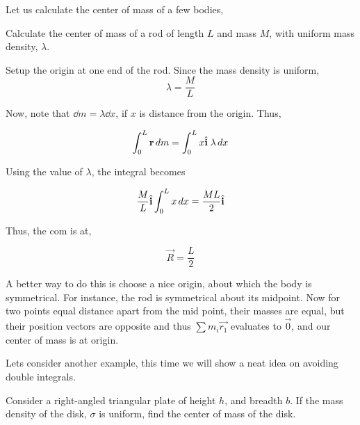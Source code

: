 Let us calculate the center of mass of a few bodies, 

\begin{example}
    Calculate the center of mass of a rod of length \(L\) and mass \(M\), with uniform mass density, \(\lambda\).
\end{example}

    \begin{soln}
        Setup the origin at one end of the rod. Since the mass density is uniform, 
        \begin{equation*}
            \lambda = \frac{M}{L}
        \end{equation*}

        Now, note that \(\dd{m} = \lambda \dd{x}\), if \(x\) is distance from the origin. Thus,

        \begin{equation*}
            \int_{0}^{L} \boldsymbol{\mathbf{r}} \mathop{}\!{d}{m} = \int_{0}^{L} x\hat{\boldsymbol{\mathbf{i}}}\;\lambda \mathop{}\!{d}{x}
        \end{equation*}

        Using the value of \(\lambda\), the integral becomes

        \begin{equation*}
            \frac{M}{L} \hat{\boldsymbol{\mathbf{i}}} \int_{0}^{L} x \mathop{}\!{d}{x} = \frac{ML}{2} \hat{\boldsymbol{\mathbf{i}}} 
        \end{equation*}

        Thus, the com is at, 

        \begin{equation}
            \vec{R} = \frac{L}{2}
        \end{equation}

    \end{soln}

A better way to do this is choose a nice origin, about which the body is symmetrical. For instance, 
the rod is symmetrical about its midpoint. Now for two points equal distance apart from the mid point,
their masses are equal, but their position vectors are opposite and thus \(\sum m_i\vec{r_1}\) evaluates 
to \(\vec{0}\), and our center of mass is at origin.

Lets consider another example, this time we will show a neat idea on avoiding double 
integrals.



\begin{example}
    Consider a right-angled triangular plate of height \(h\), and breadth \(b\). If the mass density 
    of the disk, \(\sigma\) is uniform, find the center of mass of the disk.
\end{example}

